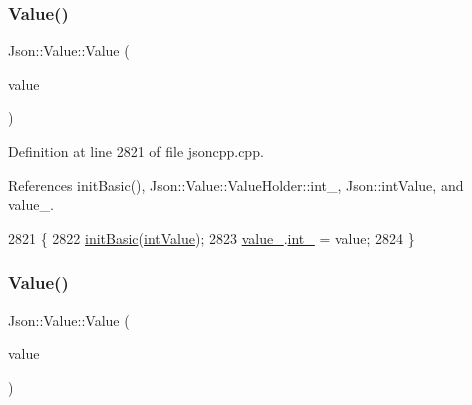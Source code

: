 \mbox{\label{class_json_1_1_value_a4744ae571fcf34f4b16a2257b3b3b585}} 
\subsubsection{\texorpdfstring{Value()}{Value()}\hspace{0.1cm}{\footnotesize\ttfamily [2/12]}}
{\footnotesize\ttfamily Json\+::\+Value\+::\+Value (\begin{DoxyParamCaption}\item[{\hyperlink{class_json_1_1_value_abdf7a7ff73eb130ffcab28504ffdb405}{Int}}]{value }\end{DoxyParamCaption})}



Definition at line 2821 of file jsoncpp.\+cpp.



References init\+Basic(), Json\+::\+Value\+::\+Value\+Holder\+::int\+\_\+, Json\+::int\+Value, and value\+\_\+.


\begin{DoxyCode}
2821                       \{
2822   \hyperlink{class_json_1_1_value_a32b86b71564157f40f880f5736be822a}{initBasic}(\hyperlink{namespace_json_a7d654b75c16a57007925868e38212b4eae5a9d708d5c9e23ae9bf98898522512d}{intValue});
2823   \hyperlink{class_json_1_1_value_aef578244546212705b9f81eb84d7e151}{value\_}.\hyperlink{union_json_1_1_value_1_1_value_holder_adbfb384301298844ed955ba5cf6015a0}{int\_} = value;
2824 \}
\end{DoxyCode}
\mbox{\label{class_json_1_1_value_ae67a857b01286e3499a87e95be848d20}} 
\subsubsection{\texorpdfstring{Value()}{Value()}\hspace{0.1cm}{\footnotesize\ttfamily [3/12]}}
{\footnotesize\ttfamily Json\+::\+Value\+::\+Value (\begin{DoxyParamCaption}\item[{\hyperlink{class_json_1_1_value_a0933d59b45793ae4aade1757c322a98d}{U\+Int}}]{value }\end{DoxyParamCaption})}



